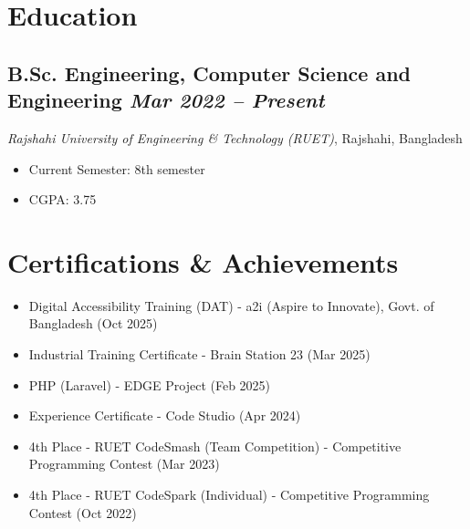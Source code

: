 \documentclass[10pt, a4paper]{article}
\newcommand{\datedsubsection}[2]{%
  \subsection*{#1 \hfill \small\textit{#2}}%
}
\newcommand{\resitem}[1]{\item #1} %
\begin{document}
\section{Education}

\datedsubsection{B.Sc. Engineering, Computer Science and Engineering}{Mar 2022 -- Present}
\textit{Rajshahi University of Engineering \& Technology (RUET)}, Rajshahi, Bangladesh
\begin{itemize}
    \resitem{Current Semester: 8th semester}
    \resitem{CGPA: 3.75}
\end{itemize}

\section{Certifications \& Achievements}
\begin{itemize}
    \resitem{Digital Accessibility Training (DAT) - a2i (Aspire to Innovate), Govt. of Bangladesh \href{https://drive.google.com/file/d/1r0YTwNWt2G--afHjJkN7hf9taI2d445W/view?usp=sharing}{\faExternalLink*} (Oct 2025)}
    \resitem{Industrial Training Certificate - Brain Station 23 \href{https://drive.google.com/file/d/1_Smp7BMAuuKgN4McPJv-UFcsK27mXtBj/view?usp=sharing}{\faExternalLink*} (Mar 2025)}
    \resitem{PHP (Laravel) - EDGE Project \href{https://training.edge.gov.bd/certificate-validation?certificate_no=EDGE-DSTS-116-6631-00012}{\faExternalLink*} (Feb 2025)}
    \resitem{Experience Certificate - Code Studio \href{https://drive.google.com/file/d/195bms3HX2eF-QGjPypnlaZmQLn2nv7xT/view?usp=sharing}{\faExternalLink*} (Apr 2024)}
    \resitem{4th Place - RUET CodeSmash (Team Competition) - Competitive Programming Contest \href{https://drive.google.com/file/d/1ESOpq2KagzqafmpEjau5RvhTNeop4FKN/view?usp=sharing}{\faExternalLink*} (Mar 2023)}
    \resitem{4th Place - RUET CodeSpark (Individual) - Competitive Programming Contest \href{https://drive.google.com/file/d/18CvmRA4xr3TkCpSjNxsQMxBSmh_yQUQz/view?usp=sharing}{\faExternalLink*} (Oct 2022)}
\end{itemize}

\end{document}
